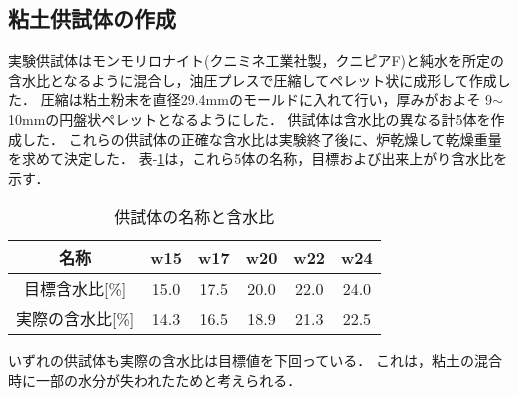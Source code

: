 \documentclass{jsce}
\begin{document}
\subsection{粘土供試体の作成}
実験供試体はモンモリロナイト(クニミネ工業社製，クニピアF)と純水を所定の
含水比となるように混合し，油圧プレスで圧縮してペレット状に成形して作成した．
圧縮は粘土粉末を直径29.4mmのモールドに入れて行い，厚みがおよそ
9$\sim$10mmの円盤状ペレットとなるようにした．
供試体は含水比の異なる計5体を作成した．
これらの供試体の正確な含水比は実験終了後に、炉乾燥して乾燥重量を求めて決定した．
表-\ref{tbl:samples}は，これら5体の名称，目標および出来上がり含水比を示す．
\begin{table}[h]
\begin{center}
\caption{供試体の名称と含水比}
	\label{tbl:samples}
\begin{tabular}{c||c|c|c|c|c}
\hline
	名称 & w15 & w17 & w20 & w22 & w24 \\
\hline
\hline
	目標含水比[\%] & 15.0 & 17.5 & 20.0 & 22.0 & 24.0 \\
\hline
	実際の含水比[\%] &  14.3 & 16.5 & 18.9 & 21.3 & 22.5  \\
\hline 
\end{tabular}
\end{center}
\end{table}
いずれの供試体も実際の含水比は目標値を下回っている．
これは，粘土の混合時に一部の水分が失われたためと考えられる．
%
\end{document}
